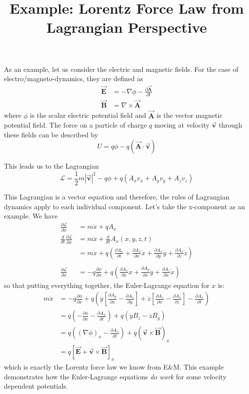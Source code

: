 \documentclass{article}
\title{Example: Lorentz Force Law from Lagrangian Perspective}
\newcommand{\bvec}[1]{\vec{\boldsymbol{#1}}}
\begin{document}
\maketitle
As an example, let us consider the electric and magnetic fields. For the case of
electro/magneto-dynamics, they are defined as
\begin{align}
  \bvec{E} &= -\nabla\phi - \frac{\partial \bvec{A}}{\partial t}\\
  \bvec{B} &= \nabla \times \bvec{A}
\end{align}
where $\phi$ is the scalar electric potential field and $\bvec{A}$ is the vector
magnetic potential field. The force on a particle of charge $q$ moving at
velocity $\bvec{v}$ through these fields can be described by
\begin{equation}
  U = q\phi - q\left(\bvec{A}\cdot\bvec{v}\right)
\end{equation}

This leads us to the Lagrangian
\begin{equation}
  \mathcal{L} = \frac{1}{2}m|\bvec{v}|^2-q\phi+q\left( A_xv_x + A_yv_y+A_zv_z \right)
\end{equation}

This Lagrangian is a vector equation and therefore, the rules of Lagrangian
dynamics apply to each individual component. Let's take the x-component as an
example. We have
\begin{align}
  \frac{\partial \mathcal{L}}{\partial \dot{x}} &= m\dot{x}+qA_x \\
  \frac{d}{dt}\frac{\partial \mathcal{L}}{\partial \dot{x}} &= m\ddot{x}+\frac{d}{dt}A_x(x,y,z,t) \\
                                                &= m\ddot{x}+ q\left( \frac{\partial A_x}{\partial t}+\frac{\partial A_x}{\partial x}\dot{x}+\frac{\partial A_x}{\partial y}\dot{y}+\frac{\partial A_x}{\partial z}\dot{z} \right) \\
  \textrm{}\nonumber\\
  \frac{\partial\mathcal{L}}{\partial x} &= -q\frac{\partial \phi}{\partial x}+q\left( \frac{\partial A_x}{\partial x}\dot{x}+\frac{\partial A_y}{\partial x}\dot{y} + \frac{\partial A_z}{\partial x}\dot{x} \right)
\end{align}
so that putting everything together, the Euler-Lagrange equation for $x$ is:
\begin{align}
  m\ddot{x} &= -q\frac{\partial \phi}{\partial x}+q\left( \dot{y}\left[\frac{\partial A_y}{\partial x}-\frac{\partial A_x}{\partial y}  \right]+\dot{z}\left[ \frac{\partial A_z}{\partial x}-\frac{\partial A_x}{\partial z} \right]-\frac{\partial A_x}{\partial t} \right)\\
            &=q\left( -\frac{\partial \phi}{\partial x}-\frac{\partial A_x}{\partial t} \right)+q\left( \dot{y}B_z-\dot{z}B_y \right) \\
            &= q\left( (\nabla\phi)_x-\frac{\partial A_x}{\partial t} \right)+ q\left( \bvec{v}\times\bvec{B} \right)_x\\
  &= q\left[ \bvec{E}+\bvec{v}\times\bvec{B} \right]_x
\end{align}
which is exactly the Lorentz force law we know from E\&M. This example
demonstrates how the Euler-Lagrange equations \textit{do work} for some velocity
dependent potentials.
\end{document}
